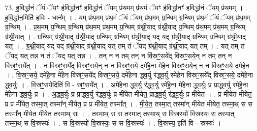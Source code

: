 \documentclass[17pt]{extarticle}
\begin{document}
73. ह॒वि॒र्द्धानं॒ ॅयं ॅयꣳ ह॑वि॒र्द्धानꣳ॑ हवि॒र्द्धानं॒ ॅयम् प्र॑थ॒मम् प्र॑थ॒मं ॅयꣳ ह॑वि॒र्द्धानꣳ॑ हवि॒र्द्धानं॒ ॅयम् प्र॑थ॒मम् । . ह॒वि॒र्द्धान॒मिति॑ हविः - धान᳚म् । . यम् प्र॑थ॒मम् प्र॑थ॒मं ॅयं ॅयम् प्र॑थ॒मम् ग्र॒न्थिम् ग्र॒न्थिम् प्र॑थ॒मं ॅयं ॅयम् प्र॑थ॒मम् ग्र॒न्थिम् । . प्र॒थ॒मम् ग्र॒न्थिम् ग्र॒न्थिम् प्र॑थ॒मम् प्र॑थ॒मम् ग्र॒न्थिम् ग्र॑थ्नी॒याद् ग्र॑थ्नी॒याद् ग्र॒न्थिम् प्र॑थ॒मम् प्र॑थ॒मम् ग्र॒न्थिम् ग्र॑थ्नी॒यात् । . ग्र॒न्थिम् ग्र॑थ्नी॒याद् ग्र॑थ्नी॒याद् ग्र॒न्थिम् ग्र॒न्थिम् ग्र॑थ्नी॒याद् यद् यद् ग्र॑थ्नी॒याद् ग्र॒न्थिम् ग्र॒न्थिम् ग्र॑थ्नी॒याद् यत् । . ग्र॒थ्नी॒याद् यद् यद् ग्र॑थ्नी॒याद् ग्र॑थ्नी॒याद् यत् तम् तं ॅयद् ग्र॑थ्नी॒याद् ग्र॑थ्नी॒याद् यत् तम् । . यत् तम् तं ॅयद् यत् तन्न न तं ॅयद् यत् तन्न । . तन् न न तम् तन् न वि॑स्रꣳ॒॒सये᳚द् विस्रꣳ॒॒सये॒न् न तम् तन् न वि॑स्रꣳ॒॒सये᳚त् । . न वि॑स्रꣳ॒॒सये᳚द् विस्रꣳ॒॒सये॒न् न न वि॑स्रꣳ॒॒सये॒ दमे॑हे॒ना मे॑हेन विस्रꣳ॒॒सये॒न् न न वि॑स्रꣳ॒॒सये॒ दमे॑हेन । . वि॒स्रꣳ॒॒सये॒ दमे॑हे॒ना मे॑हेन विस्रꣳ॒॒सये᳚द् विस्रꣳ॒॒सये॒ दमे॑हेना द्ध्व॒र्यु र॑द्ध्व॒र्यु रमे॑हेन विस्रꣳ॒॒सये᳚द् विस्रꣳ॒॒सये॒ दमे॑हेना द्ध्व॒र्युः । . वि॒स्रꣳ॒॒सये॒दिति॑ वि - स्रꣳ॒॒सये᳚त् । . अमे॑हेना द्ध्व॒र्यु र॑द्ध्व॒र्यु रमे॑हे॒ना मे॑हेना द्ध्व॒र्युः प्र प्राद्ध्व॒र्यु रमे॑हे॒ना मे॑हेना द्ध्व॒र्युः प्र । . अ॒द्ध्व॒र्युः प्र प्राद्ध्व॒र्यु र॑द्ध्व॒र्युः प्र मी॑येत मीयेत॒ प्राद्ध्व॒र्यु र॑द्ध्व॒र्युः प्र मी॑येत । . प्र मी॑येत मीयेत॒ प्र प्र मी॑येत॒ तस्मा॒त् तस्मा᳚न् मीयेत॒ प्र प्र मी॑येत॒ तस्मा᳚त् । . मी॒ये॒त॒ तस्मा॒त् तस्मा᳚न् मीयेत मीयेत॒ तस्मा॒थ् स स तस्मा᳚न् मीयेत मीयेत॒ तस्मा॒थ् सः । . तस्मा॒थ् स स तस्मा॒त् तस्मा॒थ् स वि॒स्रस्यो॑ वि॒स्रस्यः॒ स तस्मा॒त् तस्मा॒थ् स वि॒स्रस्यः॑ । . स वि॒स्रस्यो॑ वि॒स्रस्यः॒ स स वि॒स्रस्यः॑ । . वि॒स्रस्य॒ इति॑ वि - स्रस्यः॑ । \newline
\pagebreak
{}
\end{document}

